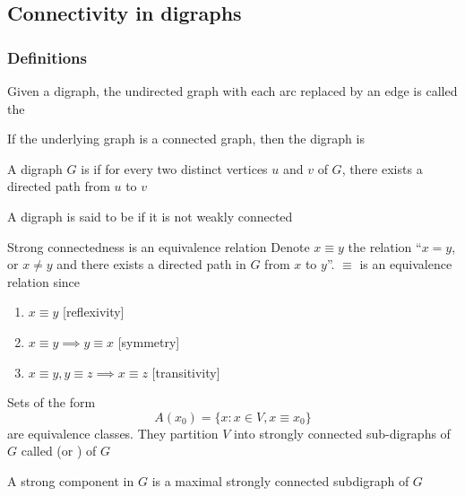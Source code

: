 \documentclass[aspectratio=43]{beamer}
\begin{document}
\subsection{Connectivity in digraphs}
\begin{frame}\frametitle{Definitions}
	\begin{definition}
	Given a digraph, the undirected graph with each arc replaced by an edge is called the 
	\end{definition}
	\vfill
	\begin{definition}
	If the underlying graph is a connected graph, then the digraph is 
	\end{definition}
	\vfill
	\begin{definition}
	A digraph $G$ is  if for every two distinct vertices $u$ and $v$ of $G$, there exists a directed path from $u$ to $v$
	\end{definition}
	\vfill
	\begin{definition}
	A digraph is said to be  if it is not weakly connected
	\end{definition}
\end{frame}

\begin{frame}{Strong connectedness is an equivalence relation}
Denote $x\equiv y$ the relation  ``$x=y$, or $x\neq y$ and there exists a directed path in $G$ from $x$ to $y$''. $\equiv$ is an equivalence relation since
\begin{enumerate}
	\item $x\equiv y$ \hfill[reflexivity]
	\item $x\equiv y\implies y\equiv x$ \hfill[symmetry]
	\item $x\equiv y, y\equiv z\implies x\equiv z$ \hfill[transitivity]
\end{enumerate}
\begin{definition}
	\label{def:strong_components}
	Sets of the form 
	\[
	A(x_0)=\{x:x\in V, x\equiv x_0\}	
	\]
	are equivalence classes. 
	They partition $V$ into strongly connected sub-digraphs of $G$ called  (or ) of $G$
\end{definition}
A strong component in $G$ is a maximal strongly connected subdigraph of $G$
\end{frame}
\end{document}
